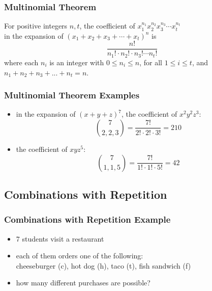 \documentclass[dvipsnames]{beamer}
\begin{document}
\begin{frame}
  \frametitle{Multinomial Theorem}

  \begin{theorem}
    For positive integers $n, t$, the coefficient of
    $x_{1}^{n_1} x_{2}^{n_2} x_{3}^{n_3} \cdots x_{t}^{n_t}$\\
    in the expansion of $(x_1 + x_2 + x_3 + \cdots + x_t)^n$ is
    \begin{equation*}
      \frac{n!}{n_1! \cdot n_2! \cdot n_3! \cdots n_t!}
    \end{equation*}
    where each $n_i$ is an integer with $0 \leq n_i \leq n$,
    for all $1 \leq i \leq t$, and\\
    $n_1 + n_2 + n_3 + ... + n_t = n$.
  \end{theorem}
\end{frame}

\begin{frame}
  \frametitle{Multinomial Theorem Examples}

  \begin{example}
    \begin{itemize}
      \item in the expansion of $(x+y+z)^7$, the coefficient of $x^2 y^2 z^3$:
      \begin{equation*}
        {7 \choose 2,2,3} = \frac{7!}{2! \cdot 2! \cdot 3!} = 210
      \end{equation*}
    \end{itemize}
    \begin{itemize}
      \item the coefficient of $x y z^5$:
      \begin{equation*}
        {7 \choose 1,1,5} = \frac{7!}{1! \cdot 1! \cdot 5!} = 42
      \end{equation*}
    \end{itemize}
  \end{example}
\end{frame}

\subsection{Combinations with Repetition}

\begin{frame}
  \frametitle{Combinations with Repetition Example}

  \begin{example}
    \begin{itemize}
      \item 7 students visit a restaurant
      \item each of them orders one of the following:\\
        cheeseburger (c), hot dog (h), taco (t), fish sandwich (f)
      \item how many different purchases are possible?
    \end{itemize}
  \end{example}
\end{frame}
\end{document}
